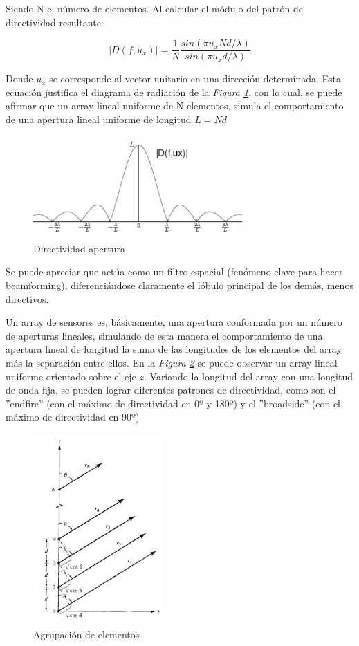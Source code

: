 \documentclass[a4paper,11pt]{book}
\begin{document}
Siendo N el número de elementos. Al calcular el módulo del patrón de directividad resultante:

	\begin{equation}
|D(f, u_x)| =\frac{1}{N}\frac{sin(\pi u_{x} N d / \lambda)}{sin(\pi u_{x} d / \lambda)}
	\end{equation}
	
Donde $u_x$ se corresponde al vector unitario en una dirección determinada. Esta ecuación justifica el diagrama de radiación de la \textit{Figura \ref{dir_ap}}, con lo cual, se puede afirmar que un array lineal uniforme de N elementos, simula el comportamiento de una apertura lineal uniforme de longitud $L = Nd$
	
	\begin{figure}[hbtp]
	\centering
	\includegraphics[width = 8cm]{FIGURAS/directividad_apertura.JPG}
	\caption{Directividad apertura}
	\label{dir_ap}
	\end{figure}
	
	 Se puede apreciar que actúa como un filtro espacial (fenómeno clave para hacer beamforming), diferenciándose claramente el lóbulo principal de los demás, menos directivos.
	 
	 Un array de sensores es, básicamente, una apertura conformada por un número de aperturas lineales, simulando de esta manera el comportamiento de una apertura lineal de longitud la suma de las longitudes de los elementos del array más la separación entre ellos. En la \textit{Figura \ref{agrupacion}} se puede observar un array lineal uniforme orientado sobre el eje $z$. Variando la longitud del array con una longitud de onda fija, se pueden lograr diferentes patrones de directividad, como son el ''endfire'' (con el máximo de directividad en 0º y 180º) y el ''broadside'' (con el máximo de directividad en 90º)
	 \begin{figure}[hbtp]
	 \centering
	 \includegraphics[width = 5cm]{FIGURAS/array_elementos.JPG}
	 \caption{Agrupación de elementos}
	 \label{agrupacion}
	 \end{figure}
	 
\end{document}
